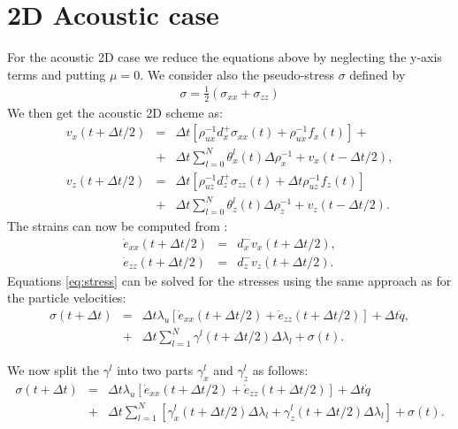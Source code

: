 \documentclass[11pt]{article}
\begin{document}
{\section*{2D Acoustic case}
For the acoustic 2D case we reduce the equations above by neglecting 
the y-axis terms
and putting $\mu=0$.
We consider also the pseudo-stress $\sigma$ defined by
\begin{eqnarray*}
\sigma = \frac{1}{2}\left(\sigma_{xx} + \sigma_{zz}\right) 
\end{eqnarray*}
We then get the acoustic 2D scheme as:
\begin{eqnarray*}
v_x(t+\Delta t/2) & = & \Delta t\left[\rho_{ux}^{-1}d^+_x \sigma_{xx}(t)  
                         + \rho_{ux}^{-1}f_x(t)\right] +\nonumber\\
           & + & \Delta t \sum_{l=0}^N\theta^l_{x}(t)\Delta\rho^{-1}_{x}  
                   +v_x(t-\Delta t/2),\nonumber\\
v_z(t+\Delta t/2) & = & \Delta t \left[\rho_{uz}^{-1}d^+_z \sigma_{zz}(t) 
                        + \Delta t \rho_{uz}^{-1}f_z(t)\right]\nonumber\\  
           & + & \Delta t\sum_{l=0}^N\theta^l_{z}(t)\Delta \rho^{-1}_{z}
                       +v_z(t-\Delta t/2). 
\end{eqnarray*}
The strains can now be computed from :
\begin{eqnarray*}
    \dot{e}_{xx}(t+\Delta t/2) & = & d^-_x v_x(t+\Delta t/2), \\
    \dot{e}_{zz}(t+\Delta t/2) & = & d^-_z v_z(t+\Delta t/2). 
\end{eqnarray*}
%
Equations \eqref{eq:stress}   can be solved for the stresses using 
the same approach as for the particle velocities:
\begin{eqnarray*}
  \sigma(t+\Delta t) 
       & = & \Delta t\lambda_u \left [\dot{e}_{xx}(t+\Delta t/2) 
             +\dot{e}_{zz}(t+\Delta t/2)\right]\nonumber
             +\Delta t\dot{q} \nonumber,                       \\
       & + & \Delta t\sum_{l=1}^N\gamma^l(t+\Delta t/2)\Delta\lambda_l  
                           + \sigma(t).
\end{eqnarray*} 

We now split the $\gamma^l$ into two parts $\gamma^l_x$ and $\gamma^l_z$ 
as follows:
\begin{eqnarray*}
  \sigma(t+\Delta t) & = & \Delta t\lambda_u \left [\dot{e}_{xx}(t+\Delta t/2) 
                          +\dot{e}_{zz}(t+\Delta t/2)\right]\nonumber
                           +\Delta t\dot{q} \nonumber\\
                     & + & \Delta t
                 \sum_{l=1}^N\left[\gamma^l_{x}(t+\Delta t/2)\Delta\lambda_l  
                                                   +\gamma^l_{z}(t+\Delta t/2)\Delta\lambda_l  \right]
                           + \sigma(t).\\
\end{eqnarray*} 

}
\end{document}
